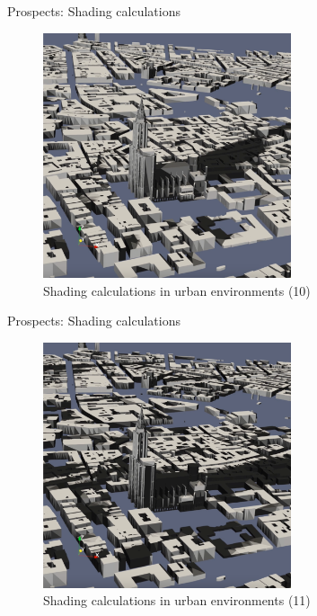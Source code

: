 \documentclass[10pt]{beamer}
\begin{document}
\begin{frame}{Prospects: Shading calculations}
  \begin{figure}
      \centering
      \includegraphics[width=0.65\textwidth]{images/shading-10.png}
      \caption{Shading calculations in urban environments (10)}
  \end{figure}
\end{frame}

\begin{frame}{Prospects: Shading calculations}
  \begin{figure}
      \centering
      \includegraphics[width=0.65\textwidth]{images/shading-11.png}
      \caption{Shading calculations in urban environments (11)}
  \end{figure}
\end{frame}
\end{document}
